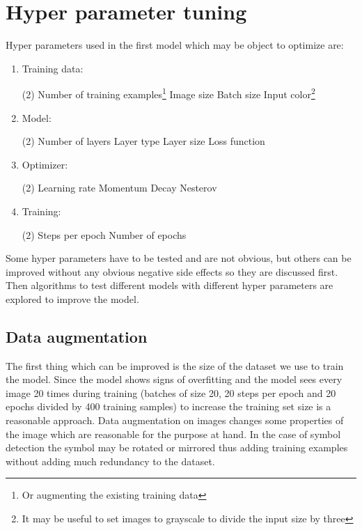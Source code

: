 \section{Hyper parameter tuning}

Hyper parameters used in the first model which may be object to optimize are:
\begin{enumerate}
    \item Training data:
    \begin{tasks}(2)
        \task Number of training examples\footnote{Or augmenting the existing training data}
        \task Image size
        \task Batch size
        \task Input color\footnote{It may be useful to set images to grayscale to divide the input size by three}
    \end{tasks}
    \item Model:
    \begin{tasks}(2)
        \task Number of layers
        \task Layer type
        \task Layer size
        \task Loss function
    \end{tasks}
    \item Optimizer:
    \begin{tasks}(2)
        \task Learning rate
        \task Momentum
        \task Decay
        \task Nesterov
    \end{tasks}
    \item Training:
    \begin{tasks}(2)
        \task Steps per epoch
        \task Number of epochs
    \end{tasks}
\end{enumerate}

Some hyper parameters have to be tested and are not obvious, but others can be improved without any obvious negative side effects so they are discussed first. Then algorithms to test different models with different hyper parameters are explored to improve the model.

\subsection{Data augmentation}
The first thing which can be improved is the size of the dataset we use to train the model.
Since the model shows signs of overfitting and the model sees every image 20 times during training (batches of size 20, 20 steps per epoch and 20 epochs divided by 400 training samples) to increase the training set size is a reasonable approach.
Data augmentation on images changes some properties of the image which are reasonable for the purpose at hand.
In the case of symbol detection the symbol may be rotated or mirrored thus adding training examples without adding much redundancy to the dataset.

